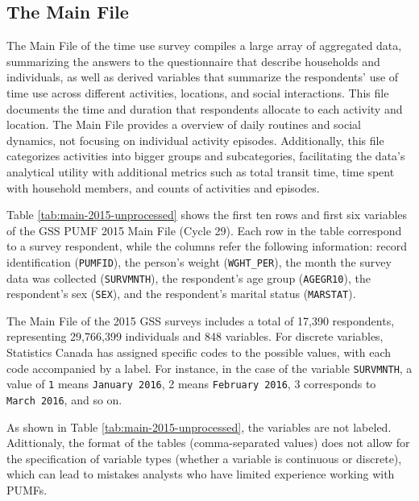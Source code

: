 \documentclass[Royal,times,sageh]{sagej}
\begin{document}
\hypertarget{the-main-file}{%
\subsection{The Main File}\label{the-main-file}}

The Main File of the time use survey compiles a large array of
aggregated data, summarizing the answers to the questionnaire that
describe households and individuals, as well as derived variables that
summarize the respondents' use of time use across different activities,
locations, and social interactions. This file documents the time and
duration that respondents allocate to each activity and location. The
Main File provides a overview of daily routines and social dynamics, not
focusing on individual activity episodes. Additionally, this file
categorizes activities into bigger groups and subcategories,
facilitating the data's analytical utility with additional metrics such
as total transit time, time spent with household members, and counts of
activities and episodes.

Table \ref{tab:main-2015-unprocessed} shows the first ten rows and first
six variables of the GSS PUMF 2015 Main File (Cycle 29). Each row in the
table correspond to a survey respondent, while the columns refer the
following information: record identification (\texttt{PUMFID}), the
person's weight (\texttt{WGHT\_PER}), the month the survey data was
collected (\texttt{SURVMNTH}), the respondent's age group
(\texttt{AGEGR10}), the respondent's sex (\texttt{SEX}), and the
respondent's marital status (\texttt{MARSTAT}).

The Main File of the 2015 GSS surveys includes a total of 17,390
respondents, representing 29,766,399 individuals and 848 variables. For
discrete variables, Statistics Canada has assigned specific codes to the
possible values, with each code accompanied by a label. For instance, in
the case of the variable \texttt{SURVMNTH}, a value of \texttt{1} means
\texttt{January\ 2016}, 2 means \texttt{February\ 2016}, 3 corresponds
to \texttt{March\ 2016}, and so on.

As shown in Table \ref{tab:main-2015-unprocessed}, the variables are not
labeled. Adittionaly, the format of the tables (comma-separated values)
does not allow for the specification of variable types (whether a
variable is continuous or discrete), which can lead to mistakes analysts
who have limited experience working with PUMFs.

\begingroup\fontsize{8}{10}\selectfont
\end{document}
